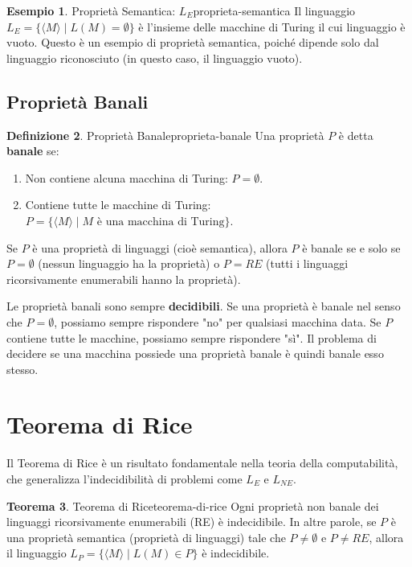 \documentclass[a4paper]{article}
\theoremstyle{definition} %
\newtheorem{theorem}{Teorema}[section]
\newtheorem{definition}[theorem]{Definizione}
\newtheorem{example}[theorem]{Esempio}
\begin{document}
\begin{example}{Proprietà Semantica: $L_E$}{proprieta-semantica}
Il linguaggio $L_E = \{\langle M \rangle \mid L(M) = \emptyset\}$ è l'insieme delle macchine di Turing il cui linguaggio è vuoto. Questo è un esempio di proprietà semantica, poiché dipende solo dal linguaggio riconosciuto (in questo caso, il linguaggio vuoto).
\end{example}

\subsection{Proprietà Banali}

\begin{definition}{Proprietà Banale}{proprieta-banale}
Una proprietà $P$ è detta \textbf{banale} se:
\begin{enumerate}
    \item Non contiene alcuna macchina di Turing: $P = \emptyset$.
    \item Contiene tutte le macchine di Turing: $P = \{\langle M \rangle \mid M \text{ è una macchina di Turing}\}$.
\end{enumerate}
Se $P$ è una proprietà di linguaggi (cioè semantica), allora $P$ è banale se e solo se $P = \emptyset$ (nessun linguaggio ha la proprietà) o $P = RE$ (tutti i linguaggi ricorsivamente enumerabili hanno la proprietà).
\end{definition}

Le proprietà banali sono sempre \textbf{decidibili}. Se una proprietà è banale nel senso che $P = \emptyset$, possiamo sempre rispondere "no" per qualsiasi macchina data. Se $P$ contiene tutte le macchine, possiamo sempre rispondere "sì". Il problema di decidere se una macchina possiede una proprietà banale è quindi banale esso stesso.

\section{Teorema di Rice}

Il Teorema di Rice è un risultato fondamentale nella teoria della computabilità, che generalizza l'indecidibilità di problemi come $L_E$ e $L_{NE}$.

\begin{theorem}{Teorema di Rice}{teorema-di-rice}
Ogni proprietà non banale dei linguaggi ricorsivamente enumerabili (RE) è indecidibile.
In altre parole, se $P$ è una proprietà semantica (proprietà di linguaggi) tale che $P \neq \emptyset$ e $P \neq RE$, allora il linguaggio $L_P = \{\langle M \rangle \mid L(M) \in P\}$ è indecidibile.
\end{theorem}
\end{document}
